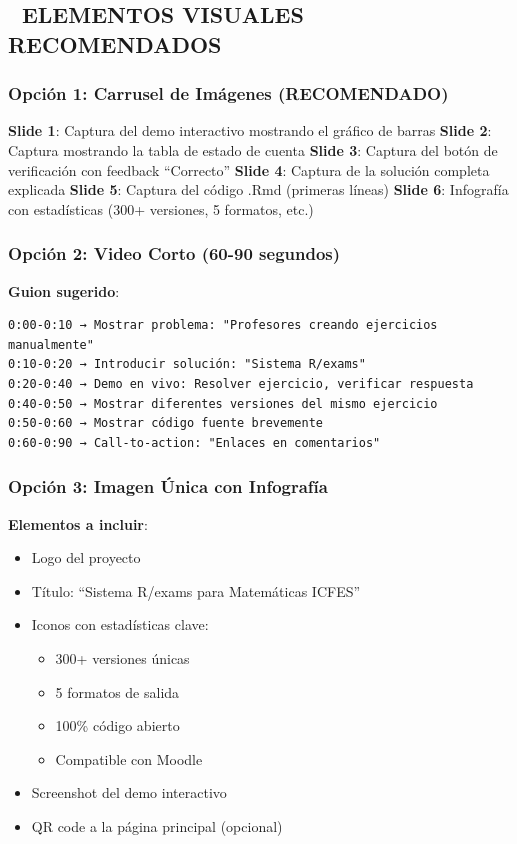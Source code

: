 \documentclass[
]{article}
\providecommand{\tightlist}{%
  \setlength{\itemsep}{0pt}\setlength{\parskip}{0pt}}
\begin{document}
\subsection{📸 ELEMENTOS VISUALES
RECOMENDADOS}\label{elementos-visuales-recomendados}

\subsubsection{Opción 1: Carrusel de Imágenes
(RECOMENDADO)}\label{opciuxf3n-1-carrusel-de-imuxe1genes-recomendado}

\textbf{Slide 1}: Captura del demo interactivo mostrando el gráfico de
barras \textbf{Slide 2}: Captura mostrando la tabla de estado de cuenta
\textbf{Slide 3}: Captura del botón de verificación con feedback
``Correcto'' \textbf{Slide 4}: Captura de la solución completa explicada
\textbf{Slide 5}: Captura del código .Rmd (primeras líneas)
\textbf{Slide 6}: Infografía con estadísticas (300+ versiones, 5
formatos, etc.)

\subsubsection{Opción 2: Video Corto (60-90
segundos)}\label{opciuxf3n-2-video-corto-60-90-segundos}

\textbf{Guion sugerido}:

\begin{verbatim}
0:00-0:10 → Mostrar problema: "Profesores creando ejercicios manualmente"
0:10-0:20 → Introducir solución: "Sistema R/exams"
0:20-0:40 → Demo en vivo: Resolver ejercicio, verificar respuesta
0:40-0:50 → Mostrar diferentes versiones del mismo ejercicio
0:50-0:60 → Mostrar código fuente brevemente
0:60-0:90 → Call-to-action: "Enlaces en comentarios"
\end{verbatim}

\subsubsection{Opción 3: Imagen Única con
Infografía}\label{opciuxf3n-3-imagen-uxfanica-con-infografuxeda}

\textbf{Elementos a incluir}:

\begin{itemize}
\tightlist
\item
  Logo del proyecto
\item
  Título: ``Sistema R/exams para Matemáticas ICFES''
\item
  Iconos con estadísticas clave:

  \begin{itemize}
  \tightlist
  \item
    300+ versiones únicas
  \item
    5 formatos de salida
  \item
    100\% código abierto
  \item
    Compatible con Moodle
  \end{itemize}
\item
  Screenshot del demo interactivo
\item
  QR code a la página principal (opcional)
\end{itemize}
\end{document}
